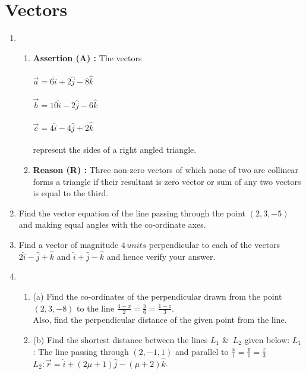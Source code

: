 \documentclass[12pt,-letter paper]{article}
\providecommand{\brak}[1]{\ensuremath{\left(#1\right)}}
\begin{document}
\section {Vectors}
\begin {enumerate}
\item   \begin {enumerate}
\item [] \textbf{Assertion (A) :} The vectors \\ \\
                $ \vec{a}=6\hat{i}+2\hat{j}-8\hat{k}$ \\ \\
                $ \vec{b} = 10\hat{i}-2\hat{j}-6\hat{k}$  \\ \\
                $ \vec{c} = 4\hat{i}-4\hat{j}+2\hat{k}$  \\ \\
                represent the sides of a right angled triangle.
\item [] \textbf{Reason (R)    :} Three non-zero vectors of which none of two are collinear forms a triangle if their resultant is zero vector or sum of any two vectors is equal to the third.
        \end {enumerate}

\item Find the vector equation of the line passing through the point \brak{2, 3, -5} and making equal angles with the co-ordinate axes.
                                                                                                                                                                                                                              \item Find a vector of magnitude $4\,units$ perpendicular to each of the vectors $2\hat{i}-\hat{j}+\hat{k}$ and $\hat{i}+\hat{j}-\hat{k}$ and hence verify your answer.

\item \begin {enumerate}
\item [(a)] Find the co-ordinates of the perpendicular drawn from the point \brak{2, 3, -8} to the line $\frac{4-x}{2}=\frac{y}{6}=\frac{1-z}{3}$.\\Also, find the perpendicular distance of the given point from the line.
       \item [(b)] Find the shortest distance between the lines $L_1$ \&\ $L_2$ given below:  $L_1$ : The line passing through $(2, -1, 1)$ and parallel to $\frac{x}{1}=\frac{y}{1}=\frac{z}{3}$ \\ $ L_2: \vec{r} = \hat{i}+(2\mu+1)\hat{j}-(\mu+2)\hat{k}$.
        \end {enumerate}
\end {enumerate}
\newpage
\end{document}
